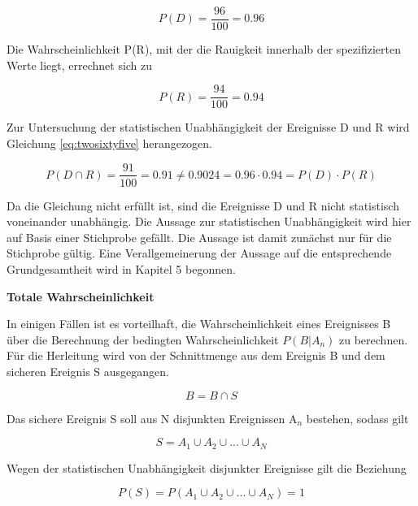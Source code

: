 \begin{equation}\label{eq:twoseventyone}
P(D)=\dfrac{96}{100} =0.96
\end{equation}

\noindent Die Wahrscheinlichkeit P(R), mit der die Rauigkeit innerhalb der spezifizierten Werte liegt, errechnet sich zu

\begin{equation}\label{eq:twoseventytwo}
P(R)=\dfrac{94}{100} =0.94
\end{equation}

\noindent Zur Untersuchung der statistischen Unabh\"{a}ngigkeit der Ereignisse D und R wird Gleichung \eqref{eq:twosixtyfive} herangezogen.

\begin{equation}\label{eq:twoseventythree}
P(D\cap R)=\dfrac{91}{100} =0.91\ne 0.9024=0.96\cdot 0.94=P(D)\cdot P(R)
\end{equation}

\noindent Da die Gleichung nicht erf\"{u}llt ist, sind die Ereignisse D und R nicht statistisch voneinander unabh\"{a}ngig. Die Aussage zur statistischen Unabh\"{a}ngigkeit wird hier auf Basis einer Stichprobe gef\"{a}llt. Die Aussage ist damit zun\"{a}chst nur f\"{u}r die Stichprobe g\"{u}ltig. Eine Verallgemeinerung der Aussage auf die entsprechende Grundgesamtheit wird in Kapitel 5 begonnen. \bigskip

{\selectfont
\noindent\textbf{Totale Wahrscheinlichkeit}} \smallskip

\noindent In einigen F\"{a}llen ist es vorteilhaft, die Wahrscheinlichkeit eines Ereignisses B \"{u}ber die Berechnung der bedingten Wahrscheinlichkeit $P(B|A_{n})$ zu berechnen. F\"{u}r die Herleitung wird von der Schnittmenge aus dem Ereignis B und dem sicheren Ereignis S ausgegangen.

\begin{equation}\label{eq:twoseventyfour}
B=B\cap S
\end{equation}

\noindent Das sichere Ereignis S soll aus N disjunkten Ereignissen A${}_{n}$ bestehen, sodass gilt

\begin{equation}\label{eq:twoseventyfive}
S=A_{1} \cup A_{2} \cup ...\cup A_{N} 
\end{equation}

\noindent Wegen der statistischen Unabh\"{a}ngigkeit disjunkter Ereignisse gilt die Beziehung

\begin{equation}\label{eq:twoseventysix}
P(S)=P(A_{1} \cup A_{2} \cup ...\cup A_{N} )=1
\end{equation}

